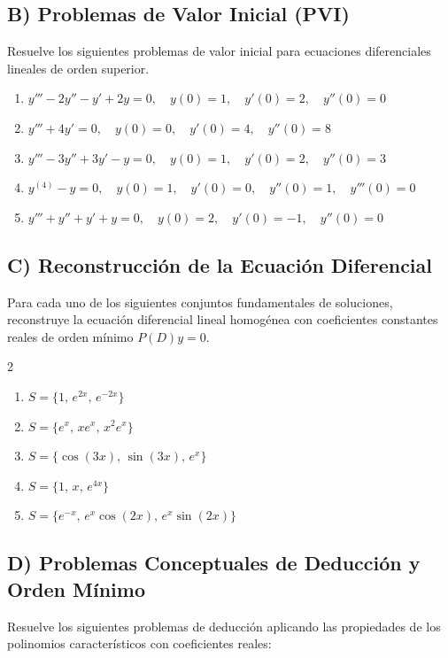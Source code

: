 \documentclass[a4paper,11pt]{article}
\begin{document}
\subsection*{B) Problemas de Valor Inicial (PVI)}
Resuelve los siguientes problemas de valor inicial para ecuaciones diferenciales lineales de orden superior.

\begin{enumerate}[itemsep=0.2cm]
    \item $y''' - 2y'' - y' + 2y = 0, \quad y(0) = 1, \quad y'(0) = 2, \quad y''(0) = 0$
    \item $y''' + 4y' = 0, \quad y(0) = 0, \quad y'(0) = 4, \quad y''(0) = 8$
    \item $y''' - 3y'' + 3y' - y = 0, \quad y(0) = 1, \quad y'(0) = 2, \quad y''(0) = 3$
    \item $y^{(4)} - y = 0, \quad y(0) = 1, \quad y'(0) = 0, \quad y''(0) = 1, \quad y'''(0) = 0$
    \item $y''' + y'' + y' + y = 0, \quad y(0) = 2, \quad y'(0) = -1, \quad y''(0) = 0$
\end{enumerate}

\subsection*{C) Reconstrucción de la Ecuación Diferencial}
Para cada uno de los siguientes conjuntos fundamentales de soluciones, reconstruye la ecuación diferencial lineal homogénea con coeficientes constantes reales de orden mínimo $P(D)y = 0$.

\begin{multicols}{2}
\begin{enumerate}[itemsep=0.15cm]
    \item $S = \{1, \, e^{2x}, \, e^{-2x}\}$
    \item $S = \{e^x, \, x e^x, \, x^2 e^x\}$
    \item $S = \{\cos(3x), \, \sin(3x), \, e^x\}$
    \item $S = \{1, \, x, \, e^{4x}\}$
    \item $S = \{e^{-x}, \, e^x \cos(2x), \, e^x \sin(2x)\}$
\end{enumerate}
\end{multicols}

\subsection*{D) Problemas Conceptuales de Deducción y Orden Mínimo}
Resuelve los siguientes problemas de deducción aplicando las propiedades de los polinomios característicos con coeficientes reales:
\end{document}
